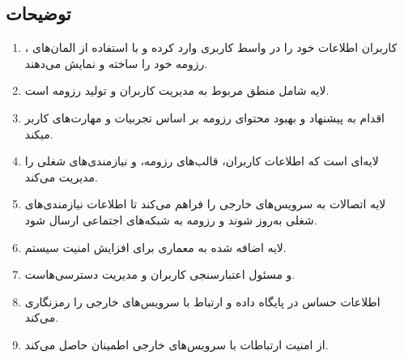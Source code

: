 \documentclass[]{article}
\begin{document}
	\subsection{\LARGE{توضیحات}}
	\begin{enumerate}
	\item 
	 کاربران اطلاعات خود را در واسط کاربری وارد کرده و با استفاده از المان‌های 
	 ، رزومه خود را ساخته و نمایش می‌دهند.
	
	\item 
	لایه
	 شامل منطق مربوط به مدیریت کاربران و تولید رزومه است.
	
	\item 
	 اقدام به پیشنهاد و بهبود محتوای رزومه بر اساس تجربیات و مهارت‌های کاربر میکند.
	
	\item
	لایه‌ای است که اطلاعات کاربران، قالب‌های رزومه، و نیازمندی‌های شغلی را مدیریت می‌کند.
	
	\item
	 لایه 
	 اتصالات به سرویس‌های خارجی را فراهم می‌کند تا اطلاعات نیازمندی‌های شغلی به‌روز شوند و رزومه به شبکه‌های اجتماعی ارسال شود.
	
	\item
	 لایه
	 اضافه شده به معماری برای افزایش امنیت سیستم.
	
	\item
	  و  
	مسئول اعتبارسنجی کاربران و مدیریت دسترسی‌هاست.
	
	\item
	اطلاعات حساس در پایگاه داده و ارتباط با سرویس‌های خارجی را رمزنگاری می‌کند.
	
	\item
	از امنیت ارتباطات با سرویس‌های خارجی اطمینان حاصل می‌کند.
	
	\end{enumerate}
	
\end{document}
